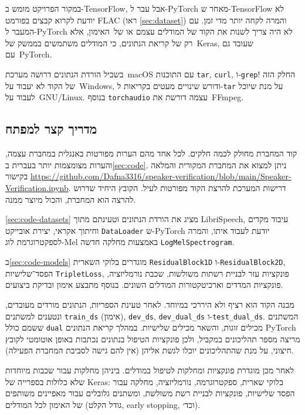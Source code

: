 \documentclass[hebrew, a4paper]{article}
\theoremstyle{plain}
\theoremstyle{definition}
\numberwithin{equation}{section}
\begin{document}
במקור הפרויקט מומש ב-TensorFlow, אבל עבר ל-PyTorch מאחר ש-TensorFlow
לא יודעת לקרוא קבצים בפורמט FLAC (ראו \autoref{sec:dataset}) והמרה
לקחה יותר מדי זמן. עם המעבר ל-PyTorch לא היה צריך לשנות את הקוד של
המודלים עצמם או של~האימון, אלא רק של קריאת הנתונים, כי המודלים משתמשים
בממשק של~Keras, שעובד גם עם~PyTorch.

בשביל הורדת הנתונים דרושה מערכת~macOS עם התוכנות \verb|tar|,
\verb|curl|, ו-\verb|grep|! החלק הזה של הקוד לא יעבוד על~Windows,
ודורש שינויים מעטים בקריאות ל-\verb|tar| על מנת שיוכל לעבוד
על~GNU/Linux. בנוסף \verb|torchaudio| עצמה דורשת את~FFmpeg.

\subsection{מדריך קצר למפתח}
\label{sec:dev-guide}

קוד המחברת מחולק לכמה חלקים. לכל אחד מהם הערות מפורטות באנגלית במחברת
עצמה, והערות מצומצמות יותר בעברית ב\autoref{sec:code}. ניתן למצוא את
המחברת המקורית והמלאה בקישור
\url{https://github.com/Dafna3316/speaker-verification/blob/main/Speaker-Verification.ipynb}.
דרישות המערכת להרצת הקוד מפורטות לעיל. הקובץ היחיד שדרוש להרצה הוא
המחברת, והכול מיוצר ממנה.

\autoref{sec:code-datasets} מציג את הורדת הנתונים וטעינתם מתוך
LibriSpeech, עיבוד מקדים וחיתוך אקראי, יצירת אובייקט \verb|DataLoader|
ש-PyTorch יודעת לעבוד איתו, והמרה לספקטרוגרמת לוג-Mel באמצעות מחלקה
חדשה \verb|LogMelSpectrogram|.

ב\autoref{sec:code-models} מוגדרים בלוקי השארית \verb|ResidualBlock1D|
ו-\verb|ResidualBlock2D|, הפסד־שלישיות \verb|TripletLoss|, פונקציות
עזר לבניית רשתות משולשות, שכבת נורמליזציה, פונקציות המדדים
וארכיטקטורות המודלים השונים. בנוסף מתבצע אימון ובדיקת ביצועים.

מבנה הקוד הוא רציף ולא היררכי במיוחד. לאחר טעינת הספריות, הנתונים
מורדים מעובדים, ונטענים למשתנים \verb|train_ds| (אימון),
\verb|dev_ds|, \verb|dev_dual_ds| ו-\verb|test_dual_ds|. המשתנים ששמם
כולל \verb|dual| מכילים זוגות, והשאר מכילים שלישיות. במהלך קריאת
הנתונים PyTorch מריצה מספר תהליכונים במקביל, ולכן פונקציות הטיפול
בנתונים נכתבות באופן אוטומטי לקובץ חיצוני, על מנת שהתהליכונים יוכלו
לגשת אליהן (אין להם גישה לסביבת המחברת הפעילה).

לאחר מכן מוגדרת פונקציות ומחלקות לטיפול במודלים. ביניהן מחלקות עבור
שכבות מיוחדות שלא כלולות בספרייה של Keras: בלוקי שארית, ספקטרוגרמה,
נורמליזציה, מחלקה עבור הפסד שלישיות, פונקציות לבניית רשת משולשת,
ומשתנים גלובלים עבור מאפיינים משותפים של האימון לכל המודלים (גודל
הקלט, early stopping, וכד׳).
\end{document}
